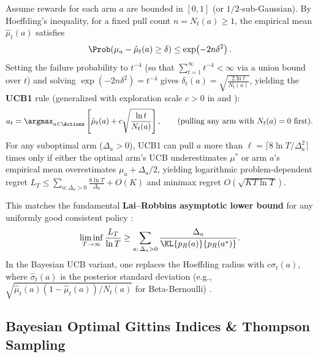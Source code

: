 \documentclass[../../../../master.tex]{subfiles}
\begin{document}
\begin{coremath}
Assume rewards for each arm $a$ are bounded in $[0,1]$ (or $1/2$-sub-Gaussian). By Hoeffding's inequality, for a fixed pull count $n = N_t(a) \ge 1$, the empirical mean $\hat{\mu}_t(a)$ satisfies
\begin{equation}
  \Prob\!\left(\mu_a - \hat{\mu}_t(a) \ge \delta\right) \le \exp\!\left(-2n\delta^2\right).
\end{equation}
Setting the failure probability to $t^{-4}$ (so that $\sum_{t=1}^\infty t^{-4} < \infty$ via a union bound over $t$) and solving $\exp(-2n\delta^2) = t^{-4}$ gives $\delta_t(a) = \sqrt{\frac{2\ln t}{N_t(a)}}$, yielding the \textbf{UCB1} rule (generalized with exploration scale $c > 0$ in  and ):
\begin{equation}
  a_t = \argmax_{a \in \Actions} \left[ \hat{\mu}_t(a) + c\sqrt{\frac{\ln t}{N_t(a)}} \right], \qquad \text{(pulling any arm with } N_t(a)=0 \text{ first)}.
  \label{eq:bandit:ucb1}
\end{equation}
For any suboptimal arm ($\Delta_a > 0$), UCB1 can pull $a$ more than $\ell = \lceil 8 \ln T / \Delta_a^2 \rceil$ times only if either the optimal arm's UCB underestimates $\mu^*$ or arm $a$'s empirical mean overestimates $\mu_a + \Delta_a/2$, yielding logarithmic problem-dependent regret $L_T \le \sum_{a:\Delta_a>0} \frac{8 \ln T}{\Delta_a} + O(K)$ and minimax regret $O(\sqrt{KT\ln T})$.

This matches the fundamental \textbf{Lai--Robbins asymptotic lower bound} for any uniformly good consistent policy :
\begin{equation}
  \liminf_{T \to \infty} \frac{L_T}{\ln T} \ge \sum_{a:\,\Delta_a > 0} \frac{\Delta_a}{\KL{p_R(a)}{p_R(a^*)}}.
  \label{eq:bandit:lai_robbins}
\end{equation}
In the Bayesian UCB variant, one replaces the Hoeffding radius with $c\hat{\sigma}_t(a)$, where $\hat{\sigma}_t(a)$ is the posterior standard deviation (e.g., $\sqrt{\hat{\mu}_t(a)(1-\hat{\mu}_t(a))/N_t(a)}$ for Beta-Bernoulli) .
\end{coremath}

\subsection{Bayesian Optimal Gittins Indices \& Thompson Sampling}
\end{document}
